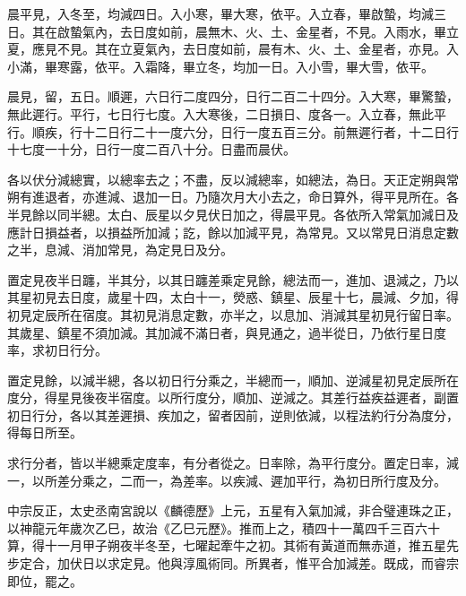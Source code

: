 \begin{pinyinscope}
 晨平見，入冬至，均減四日。入小寒，畢大寒，依平。入立春，畢啟蟄，均減三日。其在啟蟄氣內，去日度如前，晨無木、火、土、金星者，不見。入雨水，畢立夏，應見不見。其在立夏氣內，去日度如前，晨有木、火、土、金星者，亦見。入小滿，畢寒露，依平。入霜降，畢立冬，均加一日。入小雪，畢大雪，依平。



 晨見，留，五日。順遲，六日行二度四分，日行二百二十四分。入大寒，畢驚蟄，無此遲行。平行，七日行七度。入大寒後，二日損日、度各一。入立春，無此平行。順疾，行十二日行二十一度六分，日行一度五百三分。前無遲行者，十二日行十七度一十分，日行一度二百八十分。日盡而晨伏。



 各以伏分減總實，以總率去之；不盡，反以減總率，如總法，為日。天正定朔與常朔有進退者，亦進減、退加一日。乃隨次月大小去之，命日算外，得平見所在。各半見餘以同半總。太白、辰星以夕見伏日加之，得晨平見。各依所入常氣加減日及應計日損益者，以損益所加減；訖，餘以加減平見，為常見。又以常見日消息定數之半，息減、消加常見，為定見日及分。



 置定見夜半日躔，半其分，以其日躔差乘定見餘，總法而一，進加、退減之，乃以其星初見去日度，歲星十四，太白十一，熒惑、鎮星、辰星十七，晨減、夕加，得初見定辰所在宿度。其初見消息定數，亦半之，以息加、消減其星初見行留日率。其歲星、鎮星不須加減。其加減不滿日者，與見通之，過半從日，乃依行星日度率，求初日行分。



 置定見餘，以減半總，各以初日行分乘之，半總而一，順加、逆減星初見定辰所在度分，得星見後夜半宿度。以所行度分，順加、逆減之。其差行益疾益遲者，副置初日行分，各以其差遲損、疾加之，留者因前，逆則依減，以程法約行分為度分，得每日所至。



 求行分者，皆以半總乘定度率，有分者從之。日率除，為平行度分。置定日率，減一，以所差分乘之，二而一，為差率。以疾減、遲加平行，為初日所行度及分。



 中宗反正，太史丞南宮說以《麟德歷》上元，五星有入氣加減，非合璧連珠之正，以神龍元年歲次乙巳，故治《乙巳元歷》。推而上之，積四十一萬四千三百六十算，得十一月甲子朔夜半冬至，七曜起牽牛之初。其術有黃道而無赤道，推五星先步定合，加伏日以求定見。他與淳風術同。所異者，惟平合加減差。既成，而睿宗即位，罷之。



\end{pinyinscope}